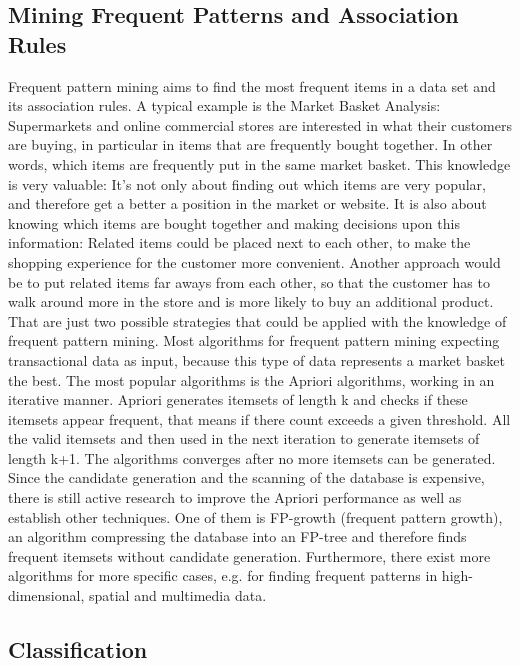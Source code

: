 \subsection{Mining Frequent Patterns and Association Rules}
Frequent pattern mining aims to find the most frequent items in a data set and its association rules. A typical example is the Market Basket Analysis: Supermarkets and online commercial stores are interested in what their customers are buying, in particular in items that are frequently bought together. In other words, which items are frequently put in the same market basket. 
This knowledge is very valuable: It’s not only about finding out which items are very popular, and therefore get a better a position in the market or website. It is also about knowing which items are bought together and making decisions upon this information: Related items could be placed next to each other, to make the shopping experience for the customer more convenient. Another approach would be to put related items far aways from each other, so that the customer has to walk around more in the store and is more likely to buy an additional product. That are just two possible strategies that could be applied with the knowledge of frequent pattern mining.
Most algorithms for frequent pattern mining expecting transactional data as input, because this type of data represents a market basket the best. The most popular algorithms is the Apriori algorithms, working in an iterative manner. Apriori generates itemsets of length k and checks if these itemsets appear frequent, that means if there count exceeds a given threshold. All the valid itemsets and then used in the next iteration to generate itemsets of length k+1. The algorithms converges after no more itemsets can be generated.
Since the candidate generation and the scanning of the database is expensive, there is still active research to improve the Apriori performance as well as establish other techniques. One of them is FP-growth (frequent pattern growth), an algorithm compressing the database into an FP-tree and therefore finds frequent itemsets without candidate generation. Furthermore, there exist more algorithms for more specific cases, e.g. for finding frequent patterns in high-dimensional, spatial and multimedia data.

\subsection{Classification}

